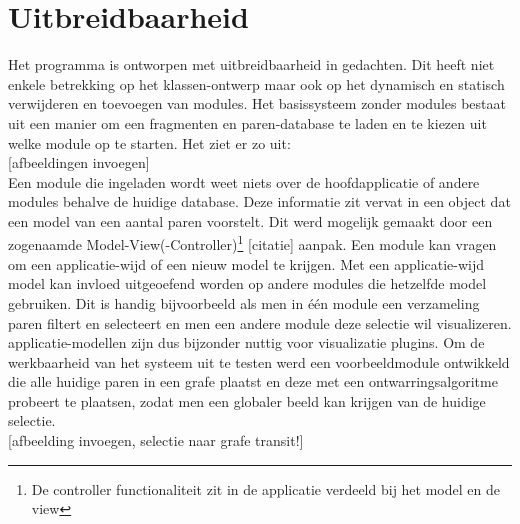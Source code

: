 \section{Uitbreidbaarheid}
Het programma is ontworpen met uitbreidbaarheid in gedachten. Dit heeft niet enkele betrekking op het klassen-ontwerp maar ook op het dynamisch en statisch verwijderen en toevoegen van modules. Het basissysteem
zonder modules bestaat uit een manier om een fragmenten en paren-database te laden en te kiezen uit welke module op te starten. Het ziet er zo uit: \\

[afbeeldingen invoegen]\\

Een module die ingeladen wordt weet niets over de hoofdapplicatie of andere modules behalve de huidige database. Deze informatie zit vervat in een object dat een model van een aantal paren voorstelt. Dit werd mogelijk gemaakt door een zogenaamde Model-View(-Controller)\footnote{De controller functionaliteit zit in de applicatie verdeeld bij het model en de view} [citatie] aanpak. Een module kan vragen om een applicatie-wijd of een nieuw model te krijgen. Met een applicatie-wijd model kan invloed uitgeoefend worden op andere modules die hetzelfde model gebruiken. Dit is handig bijvoorbeeld als men in \'e\'en module een verzameling paren filtert en selecteert en men een andere module deze selectie wil visualizeren. applicatie-modellen zijn dus bijzonder nuttig voor visualizatie plugins. Om de werkbaarheid van het systeem uit te testen werd een voorbeeldmodule ontwikkeld die alle huidige paren in een grafe plaatst en deze met een ontwarringsalgoritme probeert te plaatsen, zodat men een globaler beeld kan krijgen van de huidige selectie.\\

[afbeelding invoegen, selectie naar grafe transit!]\\
